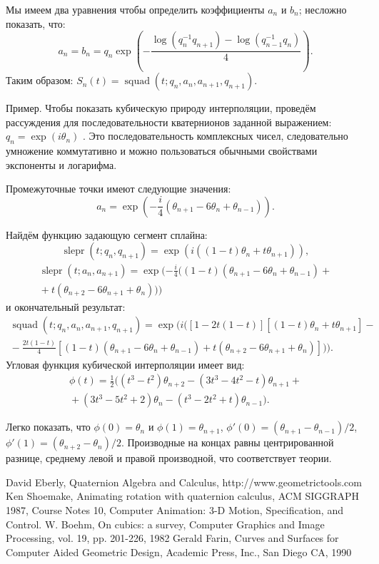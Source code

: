 \documentclass[draft]{article}
\DeclareMathOperator{\slerp}{slepr}
\DeclareMathOperator{\squad}{squad}
\begin{document}
Мы имеем два уравнения чтобы определить коэффициенты $a_n$ и $b_n$; несложно
показать, что:
\begin{equation}
\label{eq:25}
a_n = b_n = q_n \exp(-\frac{\log(q_n^{-1}q_{n + 1}) - \log(q_{n-1}^{-1}q_n)}{4}) .
\end{equation}
Таким образом: $S_n(t) = \squad(t; q_n, a_n, a_{n + 1}, q_{n+1})$.

Пример. Чтобы показать кубическую природу интерполяции, проведём рассуждения для последовательности кватернионов заданной выражением: $q_n = \exp(i \theta_n)$ . Это последовательность комплексных чисел, следовательно умножение коммутативно и можно пользоваться обычными свойствами экспоненты и логарифма.

Промежуточные точки имеют следующие значения: 
\[a_n = \exp(-\frac{i}{4}(\theta_{n + 1} - 6\theta_n + \theta_{n - 1})) .\]

Найдём функцию задающую сегмент сплайна:
\[ \slerp(t; q_n, q_{n + 1}) = \exp(i((1 - t)\theta_n + t \theta_{n + 1})) , \]
\begin{multline*}
\slerp(t; a_n, a_{n + 1}) = \exp(-\frac{i}{4} ((1 - t)(\theta_{n + 1} - 6\theta_n + \theta_{n - 1}) + {} \\
{} + t(\theta_{n + 2} - 6\theta_{n + 1} + \theta_n)))
\end{multline*}
и окончательный результат:
\begin{multline*}
\squad(t; q_n, a_n, a_{n + 1}, q_{n + 1}) = \exp(i([1 - 2 t (1 - t)][(1 -  t) \theta_n + t \theta_{n + 1}] - {} \\
{} - \frac{2 t (1 - t)}{4}[(1 - t)(\theta_{n + 1} - 6 \theta_n + \theta_{n - 1}) + t (\theta_{n + 2} - 6 \theta_{n + 1} + \theta_n)])).
\end{multline*}
Угловая функция кубической интерполяции имеет вид:
\begin{multline*}
\phi(t) = \frac{1}{2} ((t^3 - t^2) \theta_{n + 2} - (3 t^3 - 4 t^2 - t) \theta_{n + 1} + {} \\
{} + (3 t^3 - 5 t^2 + 2) \theta_n - (t^3 - 2 t^2 + t) \theta_{n - 1}) .
\end{multline*}

Легко показать, что $\phi(0) = \theta_n$ и $\phi(1) = \theta_{n+1}$, $\phi'(0) = (\theta_{n + 1} - \theta_{n - 1}) / 2$, $\phi'(1) = (\theta_{n + 2} - \theta_n) / 2$. Производные на концах равны центрированной разнице, среднему левой и правой производной, что соответствует теории.

\begin{thebibliography}{99}
David Eberly, Quaternion Algebra and Calculus, 
http://www.geometrictools.com
Ken Shoemake, Animating rotation with quaternion calculus, ACM
SIGGRAPH 1987, Course Notes 10, Computer Animation: 3-D Motion,
Specification, and Control.
W. Boehm, On cubics: a survey, Computer Graphics and Image
Processing, vol. 19, pp. 201-226, 1982
Gerald Farin, Curves and Surfaces for Computer Aided Geometric
Design, Academic Press, Inc., San Diego CA, 1990 
\end{thebibliography}
\end{document}

